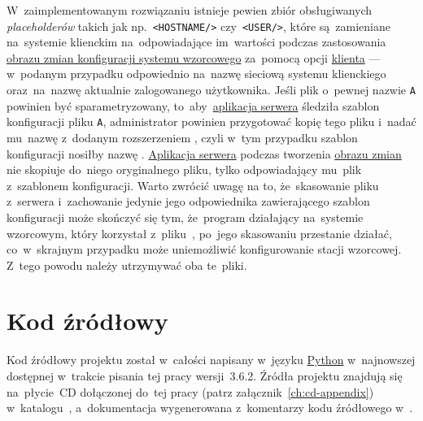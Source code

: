 \documentclass[thesis]{subfiles}
\begin{document}
W~zaimplementowanym rozwiązaniu istnieje pewien zbiór obsługiwanych \emph{placeholderów} takich jak np.~\texttt{<HOSTNAME/>} czy~\texttt{<USER/>}, które są~zamieniane na~systemie klienckim na~odpowiadające im~wartości podczas zastosowania \hyperref[sec:obraz-zmian-konfiguracji]{obrazu zmian konfiguracji systemu wzorcowego} za~pomocą opcji \hyperref[sec:cli-app]{klienta}  --- w~podanym przypadku odpowiednio na~nazwę sieciową systemu klienckiego oraz~na~nazwę aktualnie zalogowanego użytkownika. Jeśli plik o~pewnej nazwie \texttt{A} powinien być sparametryzowany, to~aby~\hyperref[sec:srv-app]{aplikacja serwera} śledziła szablon konfiguracji pliku \texttt{A}, administrator powinien przygotować kopię tego pliku i~nadać mu~nazwę z~dodanym rozszerzeniem , czyli w~tym przypadku szablon konfiguracji nosiłby nazwę . \hyperref[sec:srv-app]{Aplikacja serwera} podczas tworzenia \hyperref[sec:obraz-zmian-konfiguracji]{obrazu zmian} nie skopiuje do~niego oryginalnego pliku, tylko odpowiadający mu~plik z~szablonem konfiguracji. Warto zwrócić uwagę na to, że~skasowanie pliku  z~serwera i~zachowanie jedynie jego odpowiednika zawierającego szablon konfiguracji może skończyć się tym, że~program działający na~systemie wzorcowym, który korzystał z~pliku~, po~jego skasowaniu przestanie działać, co~w~skrajnym przypadku może uniemożliwić konfigurowanie stacji wzorcowej. Z~tego powodu należy utrzymywać oba te~pliki.


\section{Kod źródłowy}

Kod źródłowy projektu został w~całości napisany w~języku \href{https://en.wikipedia.org/wiki/Python_(programming_language)}{Python} w~najnowszej dostępnej w~trakcie pisania tej pracy wersji~3.6.2. Źródła projektu znajdują się na~płycie~CD dołączonej do~tej pracy (patrz załącznik~\ref{ch:cd-appendix}) w~katalogu~, a~dokumentacja wygenerowana z~komentarzy kodu źródłowego w~.
\end{document}
